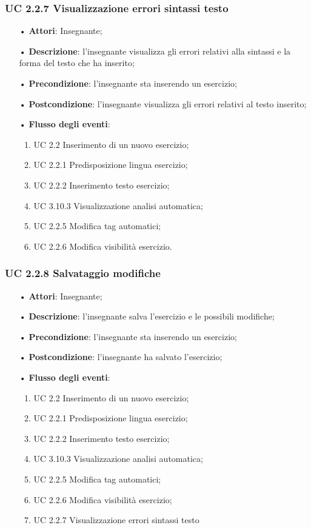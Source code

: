 \subsubsection{UC 2.2.7 Visualizzazione errori sintassi testo}
\begin{itemize}
	\item[•] \textbf{Attori}: Insegnante;
	\item[•] \textbf{Descrizione}: l'insegnante visualizza gli errori relativi alla sintassi e la forma del testo che ha inserito;
	\item[•] \textbf{Precondizione}: l'insegnante sta inserendo un esercizio;
	\item[•] \textbf{Postcondizione}: l’insegnante visualizza gli errori relativi al testo inserito;
	\item[•] \textbf{Flusso degli eventi}:
		\begin{enumerate}
		\item UC 2.2 Inserimento di un nuovo esercizio;
		\item UC 2.2.1 Predisposizione lingua esercizio;
		\item UC 2.2.2 Inserimento testo esercizio;
		\item UC 3.10.3  Visualizzazione analisi automatica;
		\item UC 2.2.5 Modifica tag automatici;
		\item UC 2.2.6 Modifica visibilità esercizio.
	\end{enumerate}
\end{itemize}

\subsubsection{UC 2.2.8 Salvataggio modifiche}
\begin{itemize}
	\item[•] \textbf{Attori}: Insegnante;
	\item[•] \textbf{Descrizione}: l'insegnante salva l'esercizio e le possibili modifiche;
	\item[•] \textbf{Precondizione}: l'insegnante sta inserendo un esercizio;
	\item[•] \textbf{Postcondizione}: l'insegnante ha salvato l'esercizio;
	\item[•] \textbf{Flusso degli eventi}:
		\begin{enumerate}
		\item UC 2.2 Inserimento di un nuovo esercizio;
		\item UC 2.2.1 Predisposizione lingua esercizio;
		\item UC 2.2.2 Inserimento testo esercizio;
		\item UC 3.10.3  Visualizzazione analisi automatica;
		\item UC 2.2.5 Modifica tag automatici;
		\item UC 2.2.6 Modifica visibilità esercizio;
		\item UC 2.2.7 Visualizzazione errori sintassi testo
	\end{enumerate}
\end{itemize}

